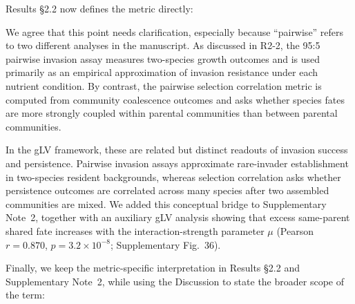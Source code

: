 Results \S2.2 now defines the metric directly: 


\responselabel
We agree that this point needs clarification, especially because ``pairwise'' refers to two different analyses in the manuscript. As discussed in R2-2, the 95:5 pairwise invasion assay measures two-species growth outcomes and is used primarily as an empirical approximation of invasion resistance under each nutrient condition. By contrast, the pairwise selection correlation metric is computed from community coalescence outcomes and asks whether species fates are more strongly coupled within parental communities than between parental communities.

In the gLV framework, these are related but distinct readouts of invasion success and persistence. Pairwise invasion assays approximate rare-invader establishment in two-species resident backgrounds, whereas selection correlation asks whether persistence outcomes are correlated across many species after two assembled communities are mixed. We added this conceptual bridge to Supplementary Note~2, together with an auxiliary gLV analysis showing that excess same-parent shared fate increases with the interaction-strength parameter $\mu$ (Pearson $r = 0.870$, $p = 3.2 \times 10^{-8}$; Supplementary Fig.~36).

Finally, we keep the metric-specific interpretation in Results \S2.2 and Supplementary Note~2, while using the Discussion to state the broader scope of the term: 

